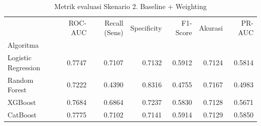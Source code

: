 \begin{table}[htbp]
\caption{Metrik evaluasi Skenario 2. Baseline + Weighting}
\label{tab:ablasi2}
\begin{tabular}{lrrrrrr}
\toprule
 & ROC-AUC & Recall (Sens) & Specificity & F1-Score & Akurasi & PR-AUC \\
Algoritma &  &  &  &  &  &  \\
\midrule
Logistic Regression & 0.7747 & 0.7107 & 0.7132 & 0.5912 & 0.7124 & 0.5814 \\
Random Forest & 0.7222 & 0.4390 & 0.8316 & 0.4755 & 0.7167 & 0.4983 \\
XGBoost & 0.7684 & 0.6864 & 0.7237 & 0.5830 & 0.7128 & 0.5671 \\
CatBoost & 0.7775 & 0.7102 & 0.7141 & 0.5914 & 0.7129 & 0.5850 \\
\bottomrule
\end{tabular}
\end{table}
